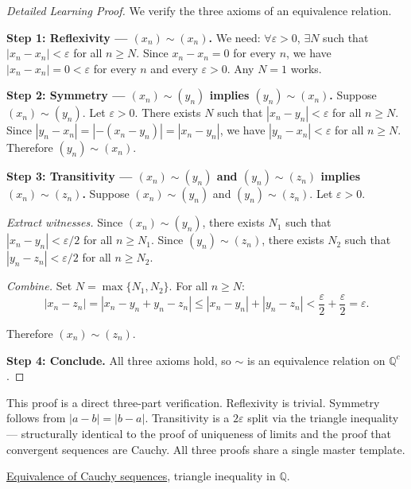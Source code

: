 \begin{proof}[Detailed Learning Proof]
\LRAProofBodyStart
We verify the three axioms of an equivalence relation.

\textbf{Step 1: Reflexivity --- $(x_n) \sim (x_n)$.}
We need: $\forall \varepsilon > 0$, $\exists N$ such that
$|x_n - x_n| < \varepsilon$ for all $n \geq N$.
Since $x_n - x_n = 0$ for every $n$, we have $|x_n - x_n| = 0 < \varepsilon$
for every $n$ and every $\varepsilon > 0$.  Any $N = 1$ works.

\textbf{Step 2: Symmetry --- $(x_n) \sim (y_n)$ implies $(y_n) \sim (x_n)$.}
Suppose $(x_n) \sim (y_n)$.  Let $\varepsilon > 0$.  There exists $N$ such
that $|x_n - y_n| < \varepsilon$ for all $n \geq N$.
Since $|y_n - x_n| = |-(x_n - y_n)| = |x_n - y_n|$, we have
$|y_n - x_n| < \varepsilon$ for all $n \geq N$.
Therefore $(y_n) \sim (x_n)$.

\textbf{Step 3: Transitivity --- $(x_n) \sim (y_n)$ and $(y_n) \sim (z_n)$
implies $(x_n) \sim (z_n)$.}
Suppose $(x_n) \sim (y_n)$ and $(y_n) \sim (z_n)$.
Let $\varepsilon > 0$.

\emph{Extract witnesses.}  Since $(x_n) \sim (y_n)$, there exists $N_1$
such that $|x_n - y_n| < \varepsilon/2$ for all $n \geq N_1$.
Since $(y_n) \sim (z_n)$, there exists $N_2$ such that
$|y_n - z_n| < \varepsilon/2$ for all $n \geq N_2$.

\emph{Combine.}  Set $N = \max\{N_1, N_2\}$.  For all $n \geq N$:
\[
|x_n - z_n|
= |x_n - y_n + y_n - z_n|
\leq |x_n - y_n| + |y_n - z_n|
< \frac{\varepsilon}{2} + \frac{\varepsilon}{2}
= \varepsilon.
\]

Therefore $(x_n) \sim (z_n)$.

\textbf{Step 4: Conclude.}
All three axioms hold, so $\sim$ is an equivalence relation on $\mathbb{Q}^c$.
\end{proof}

\begin{remark*}
This proof is a direct three-part verification.  Reflexivity is trivial.
Symmetry follows from $|a - b| = |b - a|$.  Transitivity is a
$2\varepsilon$ split via the triangle inequality --- structurally identical
to the proof of uniqueness of limits and the proof that convergent
sequences are Cauchy.  All three proofs share a single master template.
\end{remark*}

\begin{dependencies}
\hyperref[def:cauchy-equivalence]{Equivalence of Cauchy sequences},
triangle inequality in $\mathbb{Q}$.
\end{dependencies}

\clearpage
